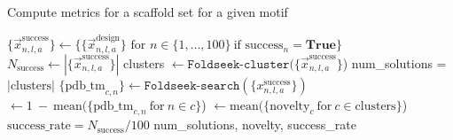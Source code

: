 \begin{algorithm}[t]
\caption{Compute metrics for a scaffold set for a given motif }\label{alg:test_backbone_set}
\begin{algorithmic}
\State $\{\vec x_{n,l,a}^{\mathrm{success}}\} \gets \{ \{\vec x_{n, l, a}^{\mathrm{design}}\} \textrm{\ for\ } n\in \{1,\dots, 100\} \ \textrm{if success}_n=\mathbf{True} \}$  
\State $N_{\mathrm{success}} \gets | \{\vec x_{n,l,a}^{\mathrm{success}}\}|$
\State 
{}
\State clusters $\gets \texttt{Foldseek-cluster}( \{\vec x_{n,l,a}^{\mathrm{success}}\}$)
\State num\_solutions = $|\textrm{clusters}|$
\State 
{}
    \State $\{\mathrm{pdb\_tm}_{c,n}\} \gets \texttt{Foldseek-search}(\{x_{n,l,a}^{\mathrm{success}}\})$ 
     $\gets 1\ - \ \mathrm{mean}(\{\mathrm{pdb\_tm}_{c,n}\  \textrm{for}\  n \in c\}$) 
     $\gets \mathrm{mean}(\{\mathrm{novelty}_c \ \textrm{for} \ c \in \textrm{clusters}\}$) 
\State 
{}
\State $\textrm{success\_rate} = N_{\mathrm{success}} / 100$
\State \Return num\_solutions, novelty, success\_rate
\EndProcedure
\end{algorithmic}
\end{algorithm}


